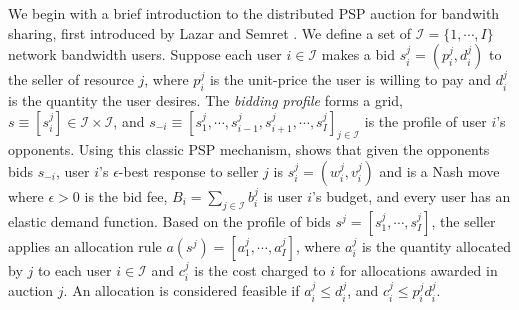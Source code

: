 \documentclass[sigconf, anonymous]{acmart}
\newcommand{\mcI}{\mathcal{I}}
\theoremstyle{definition}
\begin{document}
We begin with a brief introduction to the distributed PSP auction for bandwith
sharing, first introduced by Lazar and Semret \cite{lazar}.
We define a set of $\mcI = \lbrace 1,\cdots,I\rbrace$ network bandwidth users.
Suppose each user $i \in \mcI$ makes a bid $s_i^j = (p_i^j, d_i^j)$ to the
seller of resource $j$, where $p_i^j$ is the unit-price the user is willing to
pay and $d_i^j$ is the quantity the user desires. The \emph{bidding profile} forms a grid, $s \equiv
[s_i^j] \in \mcI \times \mcI$, and $s_{-i} \equiv [s_1^j , \cdots , s_{i-1}^j , s_{i+1}^j , \cdots
, s_I^j]_{j\in\mcI}$ is the profile of user $i$'s opponents. 
Using this classic PSP mechanism, \cite{lazar} shows that given the opponents
bids $s_{-i}$,
user $i$'s $\epsilon$-best response to seller $j$ is $s_i^j = (w_i^j, v_i^j)$
and is a Nash move
where $\epsilon > 0$ is the bid fee, $B_i =\sum_{j\in\mcI} b_i^j$ is user $i$'s
budget, and every user has an elastic demand function.
Based on the profile of bids $s^j = [s^j_1, \cdots , s^j_I]$, the seller applies
an allocation rule $a(s^j) = [a_1^j, \cdots , a_I^j]$, where $a^j_i$ is the quantity allocated
by $j$ to each user $i\in\mcI$ and $c^j_i$ is the cost charged to $i$ for
allocations awarded in auction $j$. 
An allocation is considered feasible if $a^j_i \le d_i^j$, and $c^j_i \le  p^j_i d_i^j$.

\end{document}
